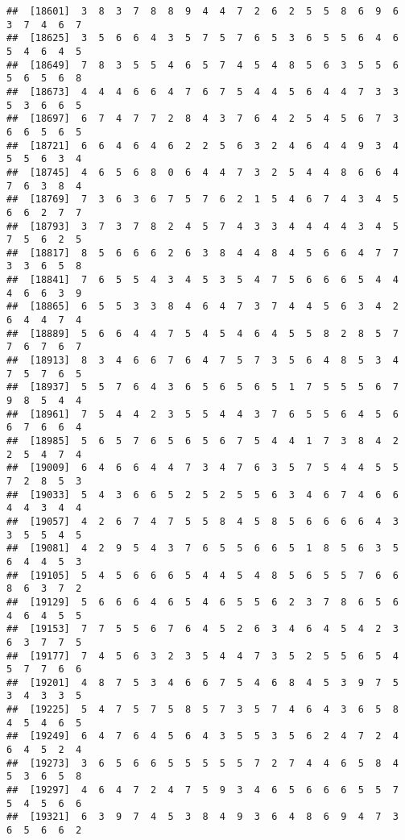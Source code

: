 \documentclass[
]{book}
\begin{document}
\begin{verbatim}
##  [18601]  3  8  3  7  8  8  9  4  4  7  2  6  2  5  5  8  6  9  6  3  7  4  6  7
##  [18625]  3  5  6  6  4  3  5  7  5  7  6  5  3  6  5  5  6  4  6  5  4  6  4  5
##  [18649]  7  8  3  5  5  4  6  5  7  4  5  4  8  5  6  3  5  5  6  5  6  5  6  8
##  [18673]  4  4  4  6  6  4  7  6  7  5  4  4  5  6  4  4  7  3  3  5  3  6  6  5
##  [18697]  6  7  4  7  7  2  8  4  3  7  6  4  2  5  4  5  6  7  3  6  6  5  6  5
##  [18721]  6  6  4  6  4  6  2  2  5  6  3  2  4  6  4  4  9  3  4  5  5  6  3  4
##  [18745]  4  6  5  6  8  0  6  4  4  7  3  2  5  4  4  8  6  6  4  7  6  3  8  4
##  [18769]  7  3  6  3  6  7  5  7  6  2  1  5  4  6  7  4  3  4  5  6  6  2  7  7
##  [18793]  3  7  3  7  8  2  4  5  7  4  3  3  4  4  4  4  3  4  5  7  5  6  2  5
##  [18817]  8  5  6  6  6  2  6  3  8  4  4  8  4  5  6  6  4  7  7  3  3  6  5  8
##  [18841]  7  6  5  5  4  3  4  5  3  5  4  7  5  6  6  6  5  4  4  4  6  6  3  9
##  [18865]  6  5  5  3  3  8  4  6  4  7  3  7  4  4  5  6  3  4  2  6  4  4  7  4
##  [18889]  5  6  6  4  4  7  5  4  5  4  6  4  5  5  8  2  8  5  7  7  6  7  6  7
##  [18913]  8  3  4  6  6  7  6  4  7  5  7  3  5  6  4  8  5  3  4  7  5  7  6  5
##  [18937]  5  5  7  6  4  3  6  5  6  5  6  5  1  7  5  5  5  6  7  9  8  5  4  4
##  [18961]  7  5  4  4  2  3  5  5  4  4  3  7  6  5  5  6  4  5  6  6  7  6  6  4
##  [18985]  5  6  5  7  6  5  6  5  6  7  5  4  4  1  7  3  8  4  2  2  5  4  7  4
##  [19009]  6  4  6  6  4  4  7  3  4  7  6  3  5  7  5  4  4  5  5  7  2  8  5  3
##  [19033]  5  4  3  6  6  5  2  5  2  5  5  6  3  4  6  7  4  6  6  4  4  3  4  4
##  [19057]  4  2  6  7  4  7  5  5  8  4  5  8  5  6  6  6  6  4  3  3  5  5  4  5
##  [19081]  4  2  9  5  4  3  7  6  5  5  6  6  5  1  8  5  6  3  5  6  4  4  5  3
##  [19105]  5  4  5  6  6  6  5  4  4  5  4  8  5  6  5  5  7  6  6  8  6  3  7  2
##  [19129]  5  6  6  6  4  6  5  4  6  5  5  6  2  3  7  8  6  5  6  4  6  4  5  5
##  [19153]  7  7  5  5  6  7  6  4  5  2  6  3  4  6  4  5  4  2  3  6  3  7  7  5
##  [19177]  7  4  5  6  3  2  3  5  4  4  7  3  5  2  5  5  6  5  4  5  7  7  6  6
##  [19201]  4  8  7  5  3  4  6  6  7  5  4  6  8  4  5  3  9  7  5  3  4  3  3  5
##  [19225]  5  4  7  5  7  5  8  5  7  3  5  7  4  6  4  3  6  5  8  4  5  4  6  5
##  [19249]  6  4  7  6  4  5  6  4  3  5  5  3  5  6  2  4  7  2  4  6  4  5  2  4
##  [19273]  3  6  5  6  6  5  5  5  5  5  7  2  7  4  4  6  5  8  4  5  3  6  5  8
##  [19297]  4  6  4  7  2  4  7  5  9  3  4  6  5  6  6  6  5  5  7  5  4  5  6  6
##  [19321]  6  3  9  7  4  5  3  8  4  9  3  6  4  8  6  9  4  7  3  6  5  6  6  2

\end{verbatim}
\end{document}
